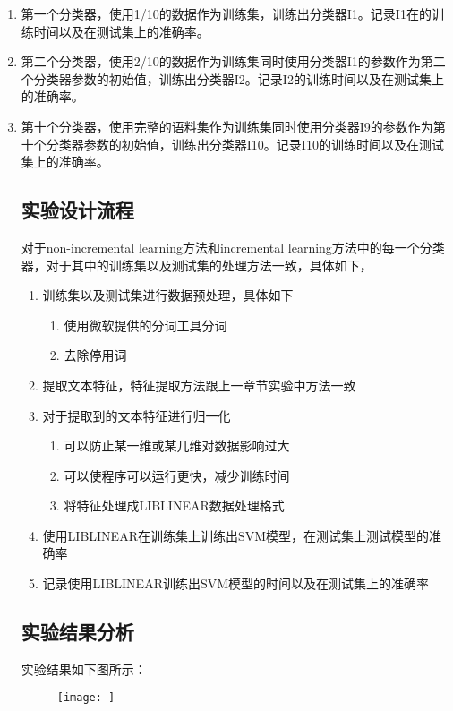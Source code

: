 \documentclass[master]{njuthesis}
\begin{document}
\begin{enumerate}
\begin{enumerate}
\begin{enumerate}
   \begin{enumerate}
     \item 第一个分类器，使用1/10的数据作为训练集，训练出分类器I1。记录I1在的训练时间以及在测试集上的准确率。
     \item 第二个分类器，使用2/10的数据作为训练集同时使用分类器I1的参数作为第二个分类器参数的初始值，训练出分类器I2。记录I2的训练时间以及在测试集上的准确率。
     \item 第十个分类器，使用完整的语料集作为训练集同时使用分类器I9的参数作为第十个分类器参数的初始值，训练出分类器I10。记录I10的训练时间以及在测试集上的准确率。
	   
\subsection{实验设计流程}
    
    对于non-incremental learning方法和incremental learning方法中的每一个分类器，对于其中的训练集以及测试集的处理方法一致，具体如下，

    \begin{enumerate}
      \item 训练集以及测试集进行数据预处理，具体如下
	\begin{enumerate}
	  \item 使用微软提供的分词工具分词
	  \item 去除停用词
	\end{enumerate}
     \item 提取文本特征，特征提取方法跟上一章节实验中方法一致
     \item 对于提取到的文本特征进行归一化
       \begin{enumerate}
         \item 可以防止某一维或某几维对数据影响过大
         \item 可以使程序可以运行更快，减少训练时间
	 \item 将特征处理成LIBLINEAR数据处理格式
       \end{enumerate}
     \item 使用LIBLINEAR在训练集上训练出SVM模型，在测试集上测试模型的准确率
     \item 记录使用LIBLINEAR训练出SVM模型的时间以及在测试集上的准确率
   \end{enumerate}

\subsection{实验结果分析}

    实验结果如下图所示：
    \begin{figure}[htbp]
      \centering
      \texttt{[image: ]}
      \caption{}\label{fig:test1}
    \end{figure}


\end{enumerate}
\end{enumerate}
\end{enumerate}
\end{enumerate}
\end{document}

